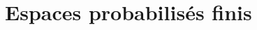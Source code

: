 \documentclass[../main.tex]{subfiles}
\begin{document}
\setcounter{chapter}{31}
\chapter{Espaces probabilisés finis}
\tableofcontents
\clearpage
\end{document}
